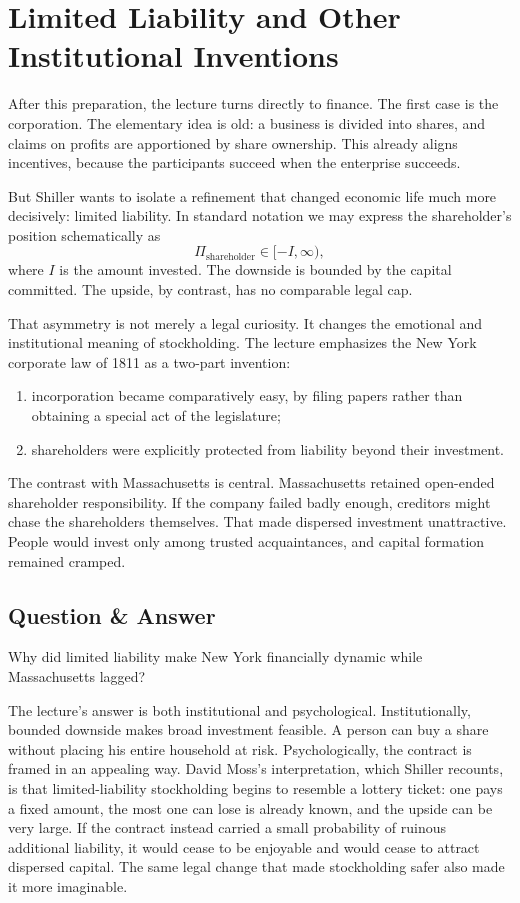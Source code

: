 \section{Limited Liability and Other Institutional Inventions}

After this preparation, the lecture turns directly to finance. The first case is the corporation. The elementary idea is old: a business is divided into shares, and claims on profits are apportioned by share ownership. This already aligns incentives, because the participants succeed when the enterprise succeeds.

But Shiller wants to isolate a refinement that changed economic life much more decisively: limited liability. In standard notation we may express the shareholder's position schematically as
\begin{equation}
\Pi_{\text{shareholder}} \in [-I,\infty),
\end{equation}
where $I$ is the amount invested. The downside is bounded by the capital committed. The upside, by contrast, has no comparable legal cap.

That asymmetry is not merely a legal curiosity. It changes the emotional and institutional meaning of stockholding. The lecture emphasizes the New York corporate law of 1811 as a two-part invention:
\begin{enumerate}
\item incorporation became comparatively easy, by filing papers rather than obtaining a special act of the legislature;
\item shareholders were explicitly protected from liability beyond their investment.
\end{enumerate}

The contrast with Massachusetts is central. Massachusetts retained open-ended shareholder responsibility. If the company failed badly enough, creditors might chase the shareholders themselves. That made dispersed investment unattractive. People would invest only among trusted acquaintances, and capital formation remained cramped.

\subsection{Question \& Answer}

Why did limited liability make New York financially dynamic while Massachusetts lagged?

The lecture's answer is both institutional and psychological. Institutionally, bounded downside makes broad investment feasible. A person can buy a share without placing his entire household at risk. Psychologically, the contract is framed in an appealing way. David Moss's interpretation, which Shiller recounts, is that limited-liability stockholding begins to resemble a lottery ticket: one pays a fixed amount, the most one can lose is already known, and the upside can be very large. If the contract instead carried a small probability of ruinous additional liability, it would cease to be enjoyable and would cease to attract dispersed capital. The same legal change that made stockholding safer also made it more imaginable.

